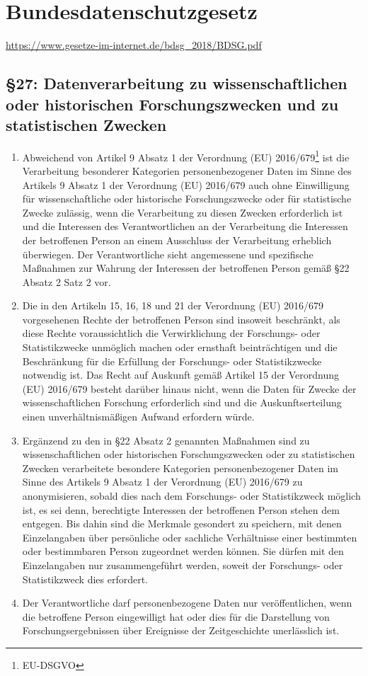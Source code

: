 \chapter{Bundesdatenschutzgesetz}
\newline
\url{https://www.gesetze-im-internet.de/bdsg_2018/BDSG.pdf}
    \section[\S 27: Datenverarbeitung zu \dots statistischen Zwecken]{\S 27: Datenverarbeitung zu wissenschaftlichen oder historischen Forschungszwecken und zu statistischen Zwecken}
        \begin{enumerate}[label=(\arabic*)]
            \item Abweichend von Artikel 9 Absatz 1 der Verordnung (EU) 2016/679\footnote{EU-DSGVO} ist die Verarbeitung besonderer Kategorien personenbezogener Daten im Sinne des Artikels 9 Absatz 1 der Verordnung (EU) 2016/679 auch ohne Einwilligung für wissenschaftliche oder historische Forschungszwecke oder für statistische Zwecke zulässig, wenn die Verarbeitung zu diesen Zwecken erforderlich ist und die Interessen des Verantwortlichen an der Verarbeitung die Interessen der betroffenen Person an einem Ausschluss der Verarbeitung erheblich überwiegen. Der Verantwortliche sieht angemessene und spezifische Maßnahmen zur Wahrung der Interessen der betroffenen Person gemäß \S 22 Absatz 2 Satz 2 vor.
            \item Die in den Artikeln 15, 16, 18 und 21 der Verordnung (EU) 2016/679 vorgesehenen Rechte der betroffenen Person sind insoweit beschränkt, als diese Rechte voraussichtlich die Verwirklichung der Forschungs- oder Statistikzwecke unmöglich machen oder ernsthaft beinträchtigen und die Beschränkung für die Erfüllung der Forschungs- oder Statistikzwecke notwendig ist. Das Recht auf Auskunft gemäß Artikel 15 der Verordnung (EU) 2016/679 besteht darüber hinaus nicht, wenn die Daten für Zwecke der wissenschaftlichen Forschung erforderlich sind und die Auskunftserteilung einen unverhältnismäßigen Aufwand erfordern würde.
            \item Ergänzend zu den in \S 22 Absatz 2 genannten Maßnahmen sind zu wissenschaftlichen oder historischen Forschungszwecken oder zu statistischen Zwecken verarbeitete besondere Kategorien personenbezogener Daten im Sinne des Artikels 9 Absatz 1 der Verordnung (EU) 2016/679 zu anonymisieren, sobald dies nach dem Forschungs- oder Statistikzweck möglich ist, es sei denn, berechtigte Interessen der betroffenen Person stehen dem entgegen. Bis dahin sind die Merkmale gesondert zu speichern, mit denen Einzelangaben über persönliche oder sachliche Verhältnisse einer bestimmten oder bestimmbaren Person zugeordnet werden können. Sie dürfen mit den Einzelangaben nur zusammengeführt werden, soweit der Forschungs- oder Statistikzweck dies erfordert.
            \item Der Verantwortliche darf personenbezogene Daten nur veröffentlichen, wenn die betroffene Person eingewilligt hat oder dies für die Darstellung von Forschungsergebnissen über Ereignisse der Zeitgeschichte unerlässlich ist.
        \end{enumerate}

